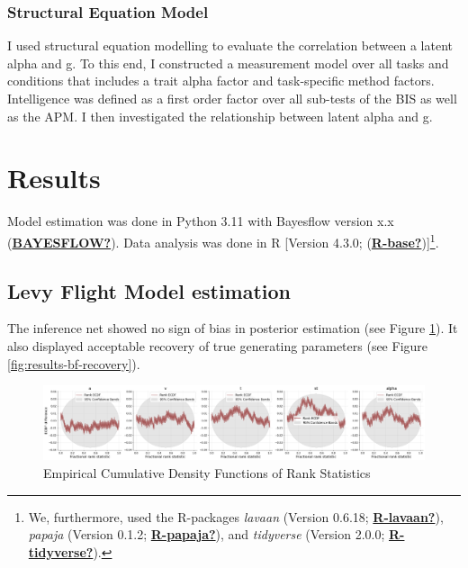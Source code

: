 \documentclass[
  man,floatsintext]{apa7}
\begin{document}
\hypertarget{structural-equation-model}{%
\subsubsection{Structural Equation Model}\label{structural-equation-model}}

I used structural equation modelling to evaluate the correlation between a latent alpha and g. To this end, I constructed a measurement model over all tasks and conditions that includes a trait alpha factor and task-specific method factors. Intelligence was defined as a first order factor over all sub-tests of the BIS as well as the APM. I then investigated the relationship between latent alpha and g.

\hypertarget{results}{%
\section{Results}\label{results}}

Model estimation was done in Python 3.11 with Bayesflow version x.x (\protect\hyperlink{ref-BAYESFLOW}{\textbf{BAYESFLOW?}}). Data analysis was done in R {[}Version 4.3.0; (\protect\hyperlink{ref-R-base}{\textbf{R-base?}}){]}\footnote{We, furthermore, used the R-packages \emph{lavaan} (Version 0.6.18; \protect\hyperlink{ref-R-lavaan}{\textbf{R-lavaan?}}), \emph{papaja} (Version 0.1.2; \protect\hyperlink{ref-R-papaja}{\textbf{R-papaja?}}), and \emph{tidyverse} (Version 2.0.0; \protect\hyperlink{ref-R-tidyverse}{\textbf{R-tidyverse?}}).}.

\hypertarget{levy-flight-model-estimation}{%
\subsection{Levy Flight Model estimation}\label{levy-flight-model-estimation}}

The inference net showed no sign of bias in posterior estimation (see Figure \ref{fig:results-bf-bias}). It also displayed acceptable recovery of true generating parameters (see Figure \ref{fig:results-bf-recovery}).



\begin{figure}
\includegraphics[width=8.3in]{images/bias_plot} \caption{Empirical Cumulative Density Functions of Rank Statistics}\label{fig:results-bf-bias}
\end{figure}
\end{document}

